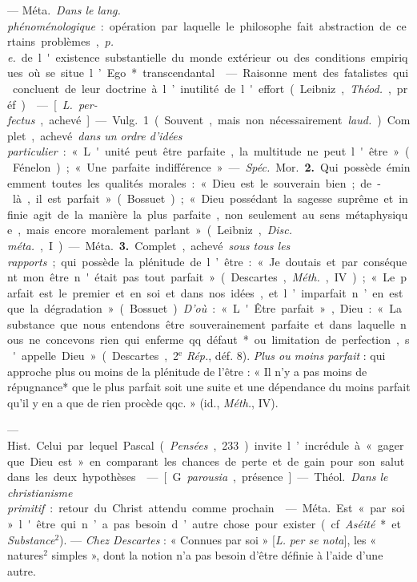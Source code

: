 \begin{itemize}[leftmargin=1cm, label=, itemsep=1pt]
 — \si{Méta.} {\it Dans le lang.
phénoménologique} : opération par laquelle le philosophe fait abstraction de
certains problèmes, {\it p. e.} de l'existence substantielle du monde
extérieur ou des conditions empiriques où se situe l’Ego* transcendantal.

 — Raisonne ment des fatalistes qui concluent de
leur doctrine à l’inutilité de l'effort (Leibniz, {\it Théod.}, préf.).

 — [{\it L.} {\it per-fectus}, achevé] — \si{Vulg.} 1. (Souvent,
mais non nécessairement {\it laud.}). Complet, achevé {\it dans un ordre
d'idées particulier} : « L'unité peut être parfaite, la multitude ne peut
l'être » (Fénelon) ; « Une parfaite indifférence ». — {\it Spéc.} \si{Mor.} 
{\bf 2.} Qui possède éminemment toutes les qualités morales : « Dieu est le
souverain bien ; de-là, il est parfait » (Bossuet) ; « Dieu possédant la
sagesse suprême et infinie agit de la manière la plus parfaite, non seulement
au sens métaphysique, mais encore moralement parlant » (Leibniz, {\it Disc.
méta.}, I).

— \si{Méta.} {\bf 3.} Complet, achevé {\it sous tous les rapports} ; qui
possède la plénitude de l’être : « Je doutais et par conséquent mon être
n'était pas tout parfait » (Descartes, {\it Méth.}, IV) ; « Le parfait est le
premier et en soi et dans nos idées, et l’imparfait n’en est que la
dégradation » (Bossuet). {\it D'où} : « L'Être parfait », Dieu : « La
substance que nous entendons être souverainement parfaite et dans laquelle
nous ne concevons rien qui enferme qq. défaut* ou limitation de
perfection, s'appelle Dieu » (Descartes, 2$^\text{e}$ {\it Rép.}, déf. 8).
{\it Plus ou moins parfait} : qui approche plus ou moins de la plénitude de
l'être : « Il n’y a pas moins de répugnance* que le plus parfait soit une
suite et une dépendance du moins parfait qu'il y en a que de rien procède
qqc. » (id., {\it Méth.}, IV).

 — \si{Hist.} Celui par lequel Pascal ({\it Pensées},
233) invite l’incrédule à « gager que Dieu est » en comparant les chances de
perte et de gain pour son salut dans les deux hypothèses.

 — [G. {\it parousia}, présence] — \si{Théol.} {\it Dans le
christianisme primitif} : retour du Christ attendu comme prochain.

 — \si{Méta.} Est « par soi » l'être qui n’a pas besoin d’autre
chose pour exister (cf. {\it Aséité}* et {\it Substance}$^2$). — {\it Chez
Descartes} : « Connues par soi » [{\it L.} {\it per se nota}], les «
natures$^2$ simples », dont la notion n’a pas besoin d’être définie à l’aide
d’une autre.


\end{itemize}
